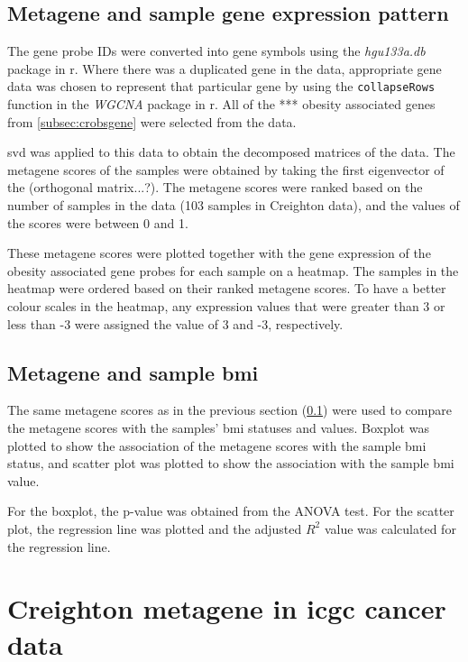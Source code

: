 \subsection{Metagene and sample gene expression pattern}
\label{subsec:crmetage}

The gene probe IDs were converted into gene symbols using the \textit{hgu133a.db} package in \gls{r}.
Where there was a duplicated gene in the data, appropriate gene data was chosen to represent that particular gene by using the \texttt{collapseRows} function in the \textit{WGCNA} package in \gls{r}.
All of the *** obesity associated genes from  \cref{subsec:crobsgene} were selected from the data.

\gls{svd} was applied to this data to obtain the decomposed matrices of the data.
The \gls{metagene} scores of the samples were obtained by taking the first eigenvector of the (orthogonal matrix...?).
The \gls{metagene} scores were ranked based on the number of samples in the data (103 samples in Creighton data), and the values of the scores were between 0 and 1.

These \gls{metagene} scores were plotted together with the gene expression of the obesity associated gene probes for each sample on a heatmap.
The samples in the heatmap were ordered based on their ranked \gls{metagene} scores.
To have a better colour scales in the heatmap, any expression values that were greater than 3 or less than -3 were assigned the value of 3 and -3, respectively.

\subsection{Metagene and sample \gls{bmi}}
\label{subsec:crmetabmi}

The same \gls{metagene} scores as in the previous section (\cref{subsec:crmetage}) were used to compare the \gls{metagene} scores with the samples' \gls{bmi} statuses and values.
Boxplot was plotted to show the association of the \gls{metagene} scores with the sample \gls{bmi} status, and scatter plot was plotted to show the association with the sample \gls{bmi} value.

For the boxplot, the p-value was obtained from the ANOVA test.
For the scatter plot, the regression line was plotted and the adjusted $R^2$ value was calculated for the regression line.


\section{Creighton metagene in \gls{icgc} cancer data}
\label{sec:crmetaicgc}

